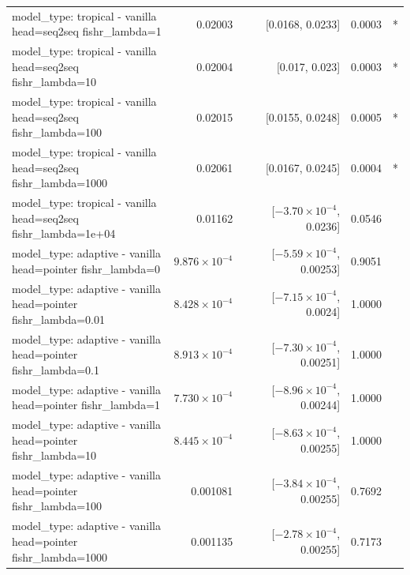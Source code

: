 \documentclass[10pt]{article}
\makeatletter
\newcommand{\stackcell}[1]{\begin{tabular}[t]{@{}l@{}}#1\end{tabular}}
\makeatother
\begin{document}
{\begin{longtable}{lrrrl}
\stackcell{model\_type: tropical - vanilla\\\footnotesize head=seq2seq fishr\_lambda=1 } & 0.02003 & [0.0168, 0.0233] & 0.0003 & *\\
\stackcell{model\_type: tropical - vanilla\\\footnotesize head=seq2seq fishr\_lambda=10 } & 0.02004 & [0.017, 0.023] & 0.0003 & *\\
\stackcell{model\_type: tropical - vanilla\\\footnotesize head=seq2seq fishr\_lambda=100 } & 0.02015 & [0.0155, 0.0248] & 0.0005 & *\\
\stackcell{model\_type: tropical - vanilla\\\footnotesize head=seq2seq fishr\_lambda=1000 } & 0.02061 & [0.0167, 0.0245] & 0.0004 & *\\
\stackcell{model\_type: tropical - vanilla\\\footnotesize head=seq2seq fishr\_lambda=1e+04 } & 0.01162 & [$-3.70\times10^{-4}$, 0.0236] & 0.0546 & \\
\stackcell{model\_type: adaptive - vanilla\\\footnotesize head=pointer fishr\_lambda=0 } & $9.876\times10^{-4}$ & [$-5.59\times10^{-4}$, 0.00253] & 0.9051 & \\
\stackcell{model\_type: adaptive - vanilla\\\footnotesize head=pointer fishr\_lambda=0.01 } & $8.428\times10^{-4}$ & [$-7.15\times10^{-4}$, 0.0024] & 1.0000 & \\
\stackcell{model\_type: adaptive - vanilla\\\footnotesize head=pointer fishr\_lambda=0.1 } & $8.913\times10^{-4}$ & [$-7.30\times10^{-4}$, 0.00251] & 1.0000 & \\
\stackcell{model\_type: adaptive - vanilla\\\footnotesize head=pointer fishr\_lambda=1 } & $7.730\times10^{-4}$ & [$-8.96\times10^{-4}$, 0.00244] & 1.0000 & \\
\stackcell{model\_type: adaptive - vanilla\\\footnotesize head=pointer fishr\_lambda=10 } & $8.445\times10^{-4}$ & [$-8.63\times10^{-4}$, 0.00255] & 1.0000 & \\
\stackcell{model\_type: adaptive - vanilla\\\footnotesize head=pointer fishr\_lambda=100 } & 0.001081 & [$-3.84\times10^{-4}$, 0.00255] & 0.7692 & \\
\stackcell{model\_type: adaptive - vanilla\\\footnotesize head=pointer fishr\_lambda=1000 } & 0.001135 & [$-2.78\times10^{-4}$, 0.00255] & 0.7173 & \\

\end{longtable}}
\end{document}
